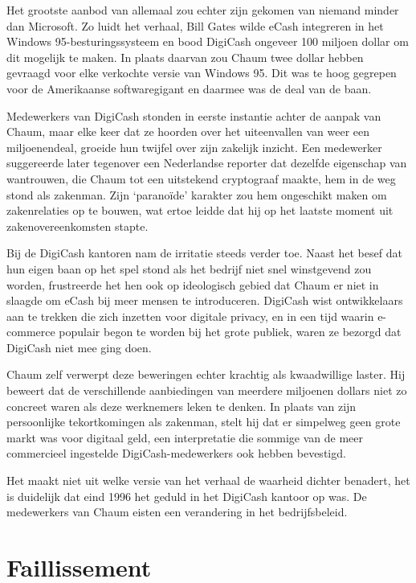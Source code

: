 \documentclass[smalldemyvopaper,11pt,twoside,onecolumn,openright,extrafontsizes,hidelinks]{memoir}
\begin{document}
Het grootste aanbod van allemaal zou echter zijn gekomen van niemand
minder dan Microsoft. Zo luidt het verhaal, Bill Gates wilde eCash
integreren in het Windows 95-besturingssysteem en bood DigiCash ongeveer
100 miljoen dollar om dit mogelijk te maken. In plaats daarvan zou Chaum
twee dollar hebben gevraagd voor elke verkochte versie van Windows 95.
Dit was te hoog gegrepen voor de Amerikaanse softwaregigant en daarmee
was de deal van de baan.

Medewerkers van DigiCash stonden in eerste instantie achter de aanpak
van Chaum, maar elke keer dat ze hoorden over het uiteenvallen van weer
een miljoenendeal, groeide hun twijfel over zijn zakelijk inzicht. Een
medewerker suggereerde later tegenover een Nederlandse reporter dat
dezelfde eigenschap van wantrouwen, die Chaum tot een uitstekend
cryptograaf maakte, hem in de weg stond als zakenman. Zijn `paranoïde'
karakter zou hem ongeschikt maken om zakenrelaties op te bouwen, wat
ertoe leidde dat hij op het laatste moment uit zakenovereenkomsten
stapte.

Bij de DigiCash kantoren nam de irritatie steeds verder toe. Naast het
besef dat hun eigen baan op het spel stond als het bedrijf niet snel
winstgevend zou worden, frustreerde het hen ook op ideologisch gebied
dat Chaum er niet in slaagde om eCash bij meer mensen te introduceren.
DigiCash wist ontwikkelaars aan te trekken die zich inzetten voor
digitale privacy, en in een tijd waarin e-commerce populair begon te
worden bij het grote publiek, waren ze bezorgd dat DigiCash niet mee
ging doen.

Chaum zelf verwerpt deze beweringen echter krachtig als kwaadwillige
laster. Hij beweert dat de verschillende aanbiedingen van meerdere
miljoenen dollars niet zo concreet waren als deze werknemers leken te
denken. In plaats van zijn persoonlijke tekortkomingen als zakenman,
stelt hij dat er simpelweg geen grote markt was voor digitaal geld, een
interpretatie die sommige van de meer commercieel ingestelde
DigiCash-medewerkers ook hebben bevestigd.

Het maakt niet uit welke versie van het verhaal de waarheid dichter
benadert, het is duidelijk dat eind 1996 het geduld in het DigiCash
kantoor op was. De medewerkers van Chaum eisten een verandering in het
bedrijfsbeleid.

\section{Faillissement}\label{faillissement}
\end{document}
